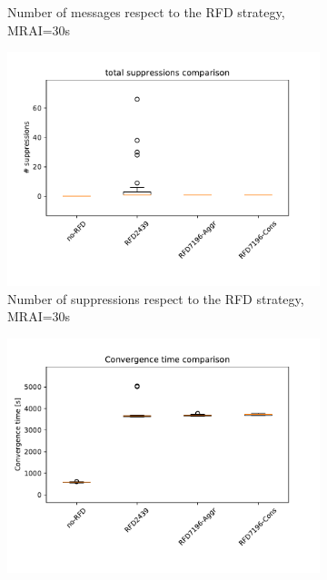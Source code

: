 \begin{figure}[H]
\begin{subfigure}[b]{0.325\textwidth}
         \caption{Number of messages respect to the RFD strategy, MRAI=30s}
         \label{fig:1000_RFD_MRAI30_messages_elephant}
     \end{subfigure}
     \hfill
     \begin{subfigure}[b]{0.325\textwidth}
         \centering
         \includegraphics[width=\textwidth]{images/RFD/miceVSelephants/MultiMRAI/30/elephants/cisco_1000MRAI30_rfd_comparison_suppressions_boxplot.pdf}
         \caption{Number of suppressions respect to the RFD strategy, MRAI=30s}
         \label{fig:1000_RFD_MRAI30_suppressions_elephant}
     \end{subfigure}
     \vfill
     \begin{subfigure}[b]{0.325\textwidth}
         \centering
         \includegraphics[width=\textwidth]{images/RFD/miceVSelephants/MultiMRAI/45/elephants/cisco_1000MRAI45_rfd_comparison_time_boxplot.pdf}

\end{subfigure}
\end{figure}
